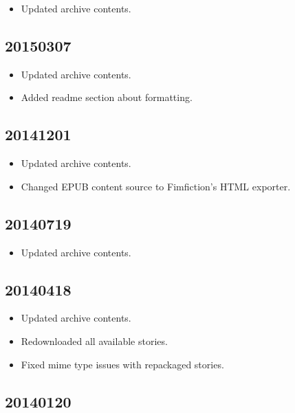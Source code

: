 \documentclass[hidelinks,a4paper,12pt]{article}
\begin{document}
\begin{itemize}
\item Updated archive contents.
\end{itemize}

\subsection{20150307}  \label{sec:changelog_20150307}

\begin{itemize}
\item Updated archive contents.
\item Added readme section about formatting.
\end{itemize}

\subsection{20141201} \label{sec:changelog_20141201}

\begin{itemize}
\item Updated archive contents.
\item Changed EPUB content source to Fimfiction's HTML exporter.
\end{itemize}

\subsection{20140719} \label{sec:changelog_20140719}

\begin{itemize}
\item Updated archive contents.
\end{itemize}

\subsection{20140418} \label{sec:changelog_20140418}

\begin{itemize}
\item Updated archive contents.
\item Redownloaded all available stories.
\item Fixed mime type issues with repackaged stories.
\end{itemize}

\subsection{20140120} \label{sec:changelog_20140120}
\end{document}
